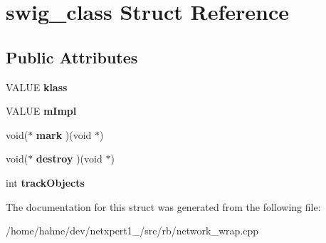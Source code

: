 \hypertarget{structswig__class}{}\section{swig\+\_\+class Struct Reference}
\label{structswig__class}
\subsection*{Public Attributes}
\begin{DoxyCompactItemize}
\item 
V\+A\+L\+UE {\bfseries klass}\hypertarget{structswig__class_ab9ed0f2df41d49a21d059a28fa8c27ce}{}\label{structswig__class_ab9ed0f2df41d49a21d059a28fa8c27ce}

\item 
V\+A\+L\+UE {\bfseries m\+Impl}\hypertarget{structswig__class_a5bd45e1a2aa1ab5bd3d7fbed50c93ec3}{}\label{structswig__class_a5bd45e1a2aa1ab5bd3d7fbed50c93ec3}

\item 
void($\ast$ {\bfseries mark} )(void $\ast$)\hypertarget{structswig__class_a5736ac16923acfe3965a37de3b7a3091}{}\label{structswig__class_a5736ac16923acfe3965a37de3b7a3091}

\item 
void($\ast$ {\bfseries destroy} )(void $\ast$)\hypertarget{structswig__class_a1a61c874ad72619e63fdd914a3c91a2a}{}\label{structswig__class_a1a61c874ad72619e63fdd914a3c91a2a}

\item 
int {\bfseries track\+Objects}\hypertarget{structswig__class_af730163aae3ff4976eca5867cb0cd032}{}\label{structswig__class_af730163aae3ff4976eca5867cb0cd032}

\end{DoxyCompactItemize}


The documentation for this struct was generated from the following file\+:\begin{DoxyCompactItemize}
\item 
/home/hahne/dev/netxpert1\+\_/src/rb/network\+\_\+wrap.\+cpp\end{DoxyCompactItemize}
